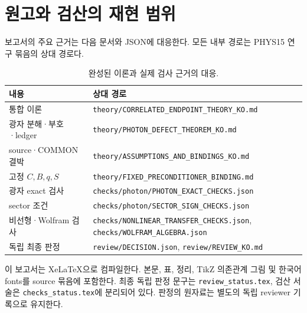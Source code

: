 \section{원고와 검산의 재현 범위}
보고서의 주요 근거는 다음 문서와 JSON에 대응한다. 모든 내부 경로는 PHYS15 연구 묶음의 상대 경로다.
\begin{table}[H]
\centering\small
\begin{tabularx}{\textwidth}{@{}p{41mm}X@{}}
\toprule
내용 & 상대 경로\\
\midrule
통합 이론 & \texttt{theory/CORRELATED\_ENDPOINT\_THEORY\_KO.md}\\
광자 분해·부호·ledger & \texttt{theory/PHOTON\_DEFECT\_THEOREM\_KO.md}\\
source·COMMON 결박 & \texttt{theory/ASSUMPTIONS\_AND\_BINDINGS\_KO.md}\\
고정 $C,B,q,S$ & \texttt{theory/FIXED\_PRECONDITIONER\_BINDING.md}\\
광자 exact 검사 & \texttt{checks/photon/PHOTON\_EXACT\_CHECKS.json}\\
sector 조건 & \texttt{checks/photon/SECTOR\_SIGN\_CHECKS.json}\\
비선형·Wolfram 검사 & \texttt{checks/NONLINEAR\_TRANSFER\_CHECKS.json}, \texttt{checks/WOLFRAM\_ALGEBRA.json}\\
독립 최종 판정 & \texttt{review/DECISION.json}, \texttt{review/REVIEW\_KO.md}\\
\bottomrule
\end{tabularx}
\caption{완성된 이론과 실제 검사 근거의 대응.}
\end{table}

이 보고서는 XeLaTeX으로 컴파일한다. 본문, 표, 정리, TikZ 의존관계 그림 및 한국어 fonts를 source 묶음에 포함한다. 최종 독립 판정 문구는 \texttt{review\_status.tex}, 검산 서술은 \texttt{checks\_status.tex}에 분리되어 있다. 판정의 원자료는 별도의 독립 reviewer 기록으로 유지한다.

